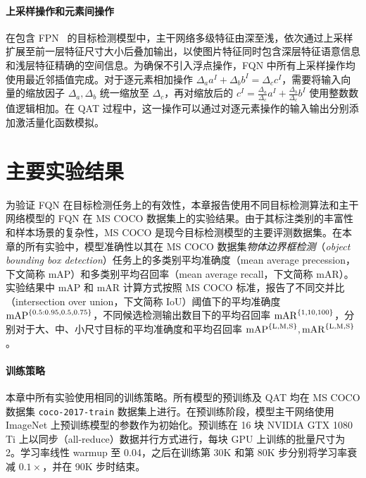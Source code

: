 \paragraph{上采样操作和元素间操作}
在包含 FPN~\citep{lin2017feature} 的目标检测模型中，主干网络多级特征由深至浅，依次通过上采样扩展至前一层特征尺寸大小后叠加输出，以使图片特征同时包含深层特征语意信息和浅层特征精确的空间信息。为确保不引入浮点操作，FQN 中所有上采样操作均使用最近邻插值完成。对于逐元素相加操作 $\Delta_a a^I + \Delta_b b^I = \Delta_c c^I$，需要将输入向量的缩放因子 $\Delta_a, \Delta_b$ 统一缩放至 $\Delta_c$，再对缩放后的 $c^I = \frac{\Delta_a}{\Delta_c}a^{I} + \frac{\Delta_b}{\Delta_c}b^{I}$ 使用整数数值逻辑相加。在 QAT 过程中，这一操作可以通过对逐元素操作的输入输出分别添加激活量化函数模拟。
\section{主要实验结果} \label{sec::fqn::experiments}
为验证 FQN 在目标检测任务上的有效性，本章报告使用不同目标检测算法和主干网络模型的 FQN 在 MS COCO 数据集上的实验结果。由于其标注类别的丰富性和样本场景的复杂性，MS COCO 是现今目标检测模型的主要评测数据集。在本章的所有实验中，模型准确性以其在 MS COCO 数据集\emph{物体边界框检测}（\emph{object bounding box detection}）任务上的多类别平均准确度（mean average precession，下文简称 mAP）和多类别平均召回率（mean average recall，下文简称 mAR）。实验结果中 mAP 和 mAR 计算方式按照 MS COCO 标准，报告了不同交并比（intersection over union，下文简称 IoU）阈值下的平均准确度 $\mathrm{mAP}^{\mathrm{ \{0.5:0.95, 0.5, 0.75\} }}$，不同候选检测输出数目下的平均召回率 $\mathrm{mAR}^{\mathrm{ \{1, 10, 100\} }}$，分别对于大、中、小尺寸目标的平均准确度和平均召回率 $\mathrm{mAP}^{\mathrm{ \{L, M, S\} }}, \mathrm{mAR}^{\mathrm{ \{L, M, S\} }}$。

\paragraph{训练策略}
本章中所有实验使用相同的训练策略。所有模型的预训练及 QAT 均在 MS COCO 数据集 \verb|coco-2017-train| 数据集上进行。在预训练阶段，模型主干网络使用 ImageNet 上预训练模型的参数作为初始化。预训练在 16 块 NVIDIA GTX 1080 Ti 上以同步（all-reduce）数据并行方式进行，每块 GPU 上训练的批量尺寸为 2。学习率线性 warmup 至 0.04，之后在训练第 30K 和第 80K 步分别将学习率衰减 $0.1\times$，并在 90K 步时结束。

